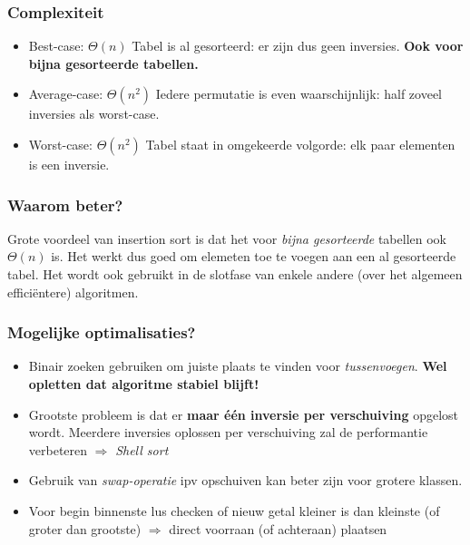 \documentclass{article}
\begin{document}
\subsubsection{Complexiteit} %
\label{sub:ins_sort_complexiteit}
\begin{itemize}
	\item Best-case: $\Theta(n)$
	Tabel is al gesorteerd: er zijn dus geen inversies. \textbf{Ook voor bijna gesorteerde tabellen.}
	\item Average-case: $\Theta(n^2)$
	Iedere permutatie is even waarschijnlijk: half zoveel inversies als worst-case.
	\item Worst-case: $\Theta(n^2)$
	Tabel staat in omgekeerde volgorde: elk paar elementen is een inversie.
\end{itemize}

\subsubsection{Waarom beter?} %
\label{sub:ins_sort_waarom_beter}
Grote voordeel van insertion sort is dat het voor \textit{bijna gesorteerde} tabellen ook $\Theta(n)$ is. Het werkt dus goed om elemeten toe te voegen aan een al gesorteerde tabel. Het wordt ook gebruikt in de slotfase van enkele andere (over het algemeen efficiëntere) algoritmen.

\subsubsection{Mogelijke optimalisaties?} %
\label{sub:ins_sortmogelijke_optimalisaties}
\begin{itemize}
	\item Binair zoeken gebruiken om juiste plaats te vinden voor \textit{tussenvoegen}. \textbf{Wel opletten dat algoritme stabiel blijft!}
	\item Grootste probleem is dat er \textbf{maar één inversie per verschuiving} opgelost wordt. Meerdere inversies oplossen per verschuiving zal de performantie verbeteren $\Rightarrow$ \textit{Shell sort}
	\item Gebruik van \textit{swap-operatie} ipv opschuiven kan beter zijn voor grotere klassen.
	\item Voor begin binnenste lus checken of nieuw getal kleiner is dan kleinste (of groter dan grootste) $\Rightarrow$ direct voorraan (of achteraan) plaatsen
\end{itemize}
\end{document}

